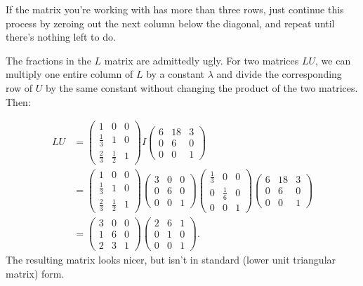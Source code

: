 If the matrix you're working with has more than three rows, just continue this process by zeroing out the next column below the diagonal, and repeat until there's nothing left to do.


The fractions in the $L$ matrix are admittedly ugly.  For two matrices $LU$, we can multiply one entire column of $L$ by a constant $\lambda$ and divide the corresponding row of $U$ by the same constant without changing the product of the two matrices.  Then:

\begin{align*}
LU &= \begin{pmatrix}
1 & 0 & 0 \\[1mm]
\frac{1}{3} & 1 & 0 \\[1mm]
\frac{2}{3} & \frac{1}{2} & 1 
\end{pmatrix}
I
\begin{pmatrix}
6 & 18 & 3 \\[1mm]
0 & 6 & 0 \\[1mm]
0 & 0 & 1 
\end{pmatrix} \\
&=
\begin{pmatrix}
1 & 0 & 0 \\[1mm]
\frac{1}{3} & 1 & 0 \\[1mm]
\frac{2}{3} & \frac{1}{2} & 1 
\end{pmatrix}
\begin{pmatrix}
3 & 0 & 0 \\
0 & 6 & 0 \\
0 & 0 & 1 
\end{pmatrix}
\begin{pmatrix}
\frac{1}{3} & 0 & 0 \\[1mm]
0 & \frac{1}{6} & 0 \\[1mm]
0 & 0 & 1 
\end{pmatrix}
\begin{pmatrix}
6 & 18 & 3 \\
0 & 6 & 0 \\
0 & 0 & 1 
\end{pmatrix} \\
&=
\begin{pmatrix}
3 & 0 & 0 \\
1 & 6 & 0 \\
2 & 3 & 1 
\end{pmatrix}\begin{pmatrix}
2 & 6 & 1 \\
0 & 1 & 0 \\
0 & 0 & 1 
\end{pmatrix}.
\end{align*}
The resulting matrix looks nicer, but isn't in standard (lower unit triangular matrix) form.

